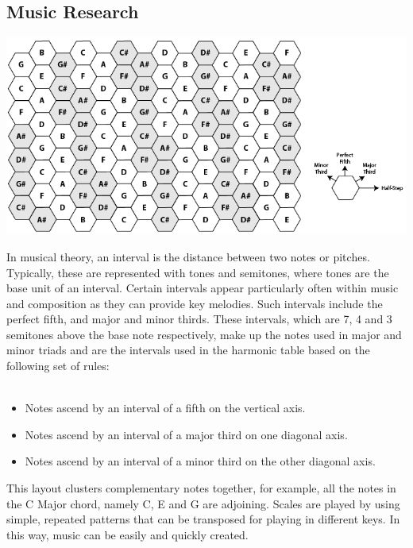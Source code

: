 \documentclass[10pt,a4paper]{article}
\begin{document}
\subsection{Music Research}
\begin{center}
\includegraphics[scale=0.5]{5.png}
\end{center}
In musical theory, an interval is the distance between two notes or pitches. Typically, these are represented with tones and semitones, where tones are the base unit of an interval. Certain intervals appear particularly often within music and composition as they can provide key melodies. Such intervals include the perfect fifth, and major and minor thirds. These intervals, which are 7, 4 and 3 semitones above the base note respectively, make up the notes used in major and minor triads and are the intervals used in the harmonic table based on the following set of rules:\\
\\
\begin{itemize}
\item Notes ascend by an interval of a fifth on the vertical axis.
\item Notes ascend by an interval of a major third on one diagonal axis.
\item Notes ascend by an interval of a minor third on the other diagonal axis.
\end{itemize}
This layout clusters complementary notes together, for example, all the notes in the C Major chord, namely C, E and G are adjoining. Scales are played by using simple, repeated patterns that can be transposed for playing in different keys. In this way, music can be easily and quickly created.\\
\end{document}
